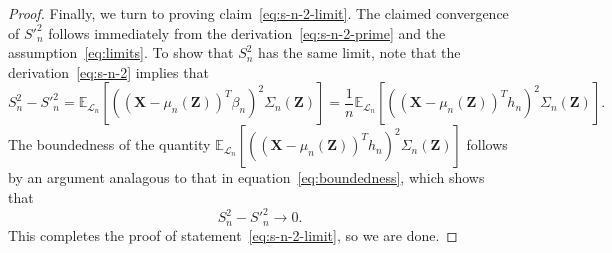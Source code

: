 \documentclass[12pt]{article}
\theoremstyle{definition}
\theoremstyle{remark}
\newcommand{\prx}{\bm X}
\newcommand{\prz}{\bm Z}
\begin{document}
\begin{proof}
	Finally, we turn to proving claim~\eqref{eq:s-n-2-limit}. The claimed convergence of $S'^2_n$ follows immediately from the derivation~\eqref{eq:s-n-2-prime} and the assumption~\eqref{eq:limits}. To show that $S_n^2$ has the same limit, note that the derivation~\eqref{eq:s-n-2} implies that 
	\begin{equation*}
		S_n^2 - S'^2_n	= \mathbb E_{\mathcal L_n}[((\prx - \mu_n(\prz))^T \beta_n)^2\Sigma_n(\prz)] = \frac{1}{n}\mathbb E_{\mathcal L_n}[((\prx - \mu_n(\prz))^T h_n)^2\Sigma_n(\prz)].
	\end{equation*}
	The boundedness of the quantity $\mathbb E_{\mathcal L_n}[((\prx - \mu_n(\prz))^T h_n)^2\Sigma_n(\prz)]$ follows by an argument analagous to that in equation~\eqref{eq:boundedness}, which shows that
	\begin{equation*}
		S_n^2 - S'^2_n \rightarrow 0.
	\end{equation*}	
	This completes the proof of statement~\eqref{eq:s-n-2-limit}, so we are done.
\end{proof}
\end{document}
